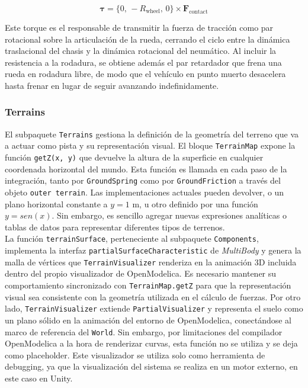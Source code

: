 \begin{equation}
    \boldsymbol{\tau} = \{0,\, -R_\text{wheel},\, 0\} \times \mathbf{F}_\text{contact}
\end{equation}


Este torque es el responsable de transmitir la fuerza de tracción como par rotacional sobre la articulación de la rueda, cerrando el ciclo entre la dinámica traslacional del chasis y la dinámica rotacional del neumático. Al incluir la resistencia a la rodadura, se obtiene además el par retardador que frena una rueda en rodadura libre, de modo que el vehículo en punto muerto desacelera hasta frenar en lugar de seguir avanzando indefinidamente.\\

\subsubsection{Terrains}

El subpaquete \verb|Terrains| gestiona la definición de la geometría del terreno que va a actuar como pista y su representación visual. El bloque \verb|TerrainMap| expone la función \verb|getZ(x, y)| que devuelve la altura de la superficie en cualquier coordenada horizontal del mundo. Esta función es llamada en cada paso de la integración, tanto por \verb|GroundSpring| como por \verb|GroundFriction| a través del objeto \texttt{outer terrain}. Las implementaciones actuales pueden devolver, o un plano horizontal constante a $y = 1$ m, u otro definido por una función $y = sen(x)$. Sin embargo, es sencillo agregar nuevas expresiones analíticas o tablas de datos para representar diferentes tipos de terrenos.\\

La función \verb|terrainSurface|, perteneciente al subpaquete \verb|Components|, implementa la interfaz 
\verb|partialSurfaceCharacteristic| de \textit{MultiBody} y genera la malla de vértices que \verb|TerrainVisualizer| renderiza en la animación 3D incluida dentro del propio visualizador de OpenModelica. Es necesario mantener su comportamiento sincronizado con \verb|TerrainMap.getZ| para que la representación visual sea consistente con la geometría utilizada en el cálculo de fuerzas. Por otro lado, \verb|TerrainVisualizer| extiende \verb|PartialVisualizer| y representa el suelo como un plano sólido en la animación del entorno de OpenModelica, conectándose al marco de referencia del \verb|World|. Sin embargo, por limitaciones del compilador OpenModelica a la hora de renderizar curvas, esta función no se utiliza y se deja como placeholder. Este visualizador se utiliza solo como herramienta de debugging, ya que la visualización del sistema se realiza en un motor externo, en este caso en Unity.\\


